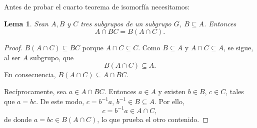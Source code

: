 \documentclass[12pt]{article}
\newtheorem{lemma}{Lema}[theorem]
\begin{document}
Antes de probar el cuarto teorema de isomorfía necesitamos:

\begin{lemma}Sean $A,B$ y $C$ tres subgrupos de un subgrupo $G$, $B \subseteq A$. Entonces $$A \cap BC = B(A \cap C).$$
\end{lemma}
\begin{proof}
$B(A \cap C) \subseteq BC$ porque $A \cap C \subseteq C$. Como $B \subseteq A$ y $A \cap C \subseteq A$, se sigue, al ser $A$ subgrupo, que $$B(A \cap C) \subseteq A.$$
En consecuencia, $B(A \cap C) \subseteq A \cap BC.$

Recíprocamente, sea $a \in A \cap BC$. Entonces $a \in A$ y existen $b \in B$, $c \in C$, tales que $a = bc.$ De este modo, $c = b^{-1}a$, $b^{-1} \in B \subseteq A$. Por ello, $$c = b^{-1}a \in A \cap C,$$ de donde $a = bc \in B (A \cap C)$, lo que prueba el otro contenido.

\end{proof}
\end{document}
